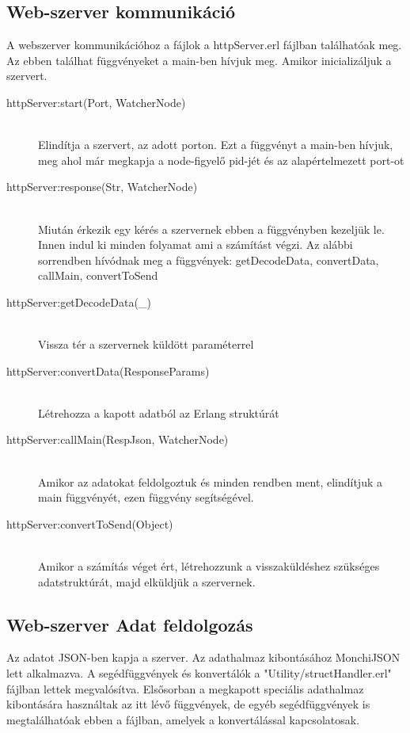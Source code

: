 \subsection{Web-szerver kommunikáció}
	A webszerver kommunikációhoz a fájlok a httpServer.erl fájlban találhatóak meg. Az ebben találhat függvényeket a main-ben hívjuk meg. Amikor inicializáljuk a szervert.
	\begin{description}
	\item[httpServer:start(Port, WatcherNode)] 
		\hfill \\
		Elindítja a szervert, az adott porton. \newline
		Ezt a függvényt a main-ben hívjuk, meg ahol már megkapja a node-figyelő pid-jét és az alapértelmezett port-ot 
	\item[httpServer:response(Str, WatcherNode)] \hfill \\ 
		Miután érkezik egy kérés a szervernek ebben a függvényben kezeljük le. Innen indul ki minden folyamat ami a számítást végzi. \newline 
		Az alábbi sorrendben hívódnak meg a függvények: \newline
		getDecodeData, convertData, callMain, convertToSend
	\item[httpServer:getDecodeData(\_)] \hfill \\ 
		Vissza tér a szervernek küldött paraméterrel
	\item[httpServer:convertData(ResponseParams)] \hfill \\ 
		Létrehozza a kapott adatból az Erlang struktúrát
	\item[httpServer:callMain(RespJson, WatcherNode)] \hfill \\ 
		Amikor az adatokat feldolgoztuk és minden rendben ment, elindítjuk a main függvényét, ezen függvény segítségével.
	\item[httpServer:convertToSend(Object)] \hfill \\ 
		Amikor a számítás véget ért, létrehozzunk a visszaküldéshez szükséges adatstruktúrát, majd elküldjük a szervernek.
	\end{description}
\subsection{Web-szerver Adat feldolgozás}
	Az adatot JSON-ben kapja a szerver. Az adathalmaz kibontásához MonchiJSON lett alkalmazva. 
	A segédfüggvények és konvertálók a "Utility/structHandler.erl" fájlban lettek megvalósítva.\newline
	Elsősorban a megkapott speciális adathalmaz kibontására használtak az itt lévő függvények, de egyéb segédfüggvények is megtalálhatóak ebben a fájlban, amelyek a konvertálással kapcsolatosak.

